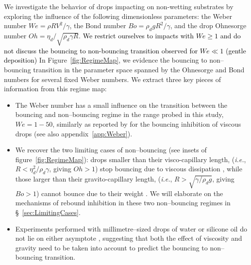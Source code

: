 \documentclass{jfm}
\newcommand{\Ohn}{\mathit{Oh}}
\newcommand{\Wen}{\mathit{We}}
\newcommand{\Bon}{\mathit{Bo}}
\newcommand{\revRev}[1]{\textcolor{black}{#1}}
\begin{document}
We investigate the behavior of drops impacting on non-wetting substrates by exploring the influence of the following dimensionless parameters: the Weber number $\Wen = \rho R V^2/\gamma$, the Bond number $\Bon = \rho_dgR^2/\gamma $, and the drop Ohnesorge number $\Ohn = \eta_d/\sqrt{\rho_d\gamma R}$. 
\revRev{We restrict ourselves to impacts with $\Wen \ge 1$ and do not discuss the bouncing to non-bouncing transition observed for $\Wen \ll 1$ (gentle deposition) \citep{richard2000bouncing,molavcek2012quasi,planchette2012transition}}
In Figure~\ref{fig:RegimeMap}, we evidence the bouncing to non--bouncing transition in the parameter space spanned by the Ohnesorge and Bond numbers for several fixed Weber numbers. 
We extract three key pieces of information from this regime map: 
\begin{itemize}
	\item The Weber number has a small influence on the transition between the bouncing and non--bouncing regime in the range probed in this study, $We = 1 - 50$, similarly as reported by \revRev{\citet{jha2020viscous,antonini2016contactless}} for the bouncing inhibition of viscous drops (see also appendix~\ref{app:Weber}). 
	\item We recover the two limiting cases of non--bouncing (see insets of figure~\ref{fig:RegimeMap}): drops smaller than their visco-capillary length, ({\it i.e.}, $R < \eta_d^2/\rho_d\gamma$, giving $\Ohn > 1$) stop bouncing due to viscous dissipation \citep{jha2020viscous}, while those larger than their gravito-capillary length, ({\it i.e.}, $R > \sqrt{\gamma/\rho_d g}$, giving $\Bon > 1$) cannot bounce due to their weight \citep{biance2006}. We will elaborate on the mechanisms of rebound inhibition in  these two non--bouncing regimes in \S~\ref{sec:LimitingCases}.
	\item Experiments performed with millimetre--sized drops of water or silicone oil do not lie on either asymptote \revRev{\citep{jha2020viscous,sanjay2022drop}}, suggesting that both the effect of viscosity and gravity need to be taken into account to predict the bouncing to non--bouncing transition.
\end{itemize}
\end{document}

